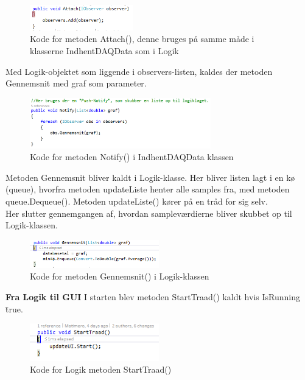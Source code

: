 \begin{figure}[H]
	\centering
	\includegraphics[width=0.4\textwidth]{FigurerProgram/AttachDaq}
	\caption{Kode for metoden Attach(), denne bruges på samme måde i klasserne IndhentDAQData som i Logik}
	\label{fig:AttachDAQ}
\end{figure}

Med Logik-objektet som liggende i observers-listen, kaldes der metoden Gennemsnit med graf som parameter.

\begin{figure}[H]
	\centering
	\includegraphics[width=0.7\textwidth]{FigurerProgram/NotifyDaq}
	\caption{Kode for metoden Notify() i IndhentDAQData klassen}
	\label{fig:NotifyDAQ}
\end{figure}

Metoden Gennemsnit bliver kaldt i Logik-klasse. Her bliver listen lagt i en kø (queue), hvorfra metoden updateListe henter alle samples fra, med metoden queue.Dequeue(). Metoden updateListe() kører på en tråd for sig selv.
\\Her slutter gennemgangen af, hvordan sampleværdierne bliver skubbet op til Logik-klassen.

\begin{figure}[H]
	\centering
	\includegraphics[width=0.5\textwidth]{FigurerProgram/GennemsnitLogik}
	\caption{Kode for metoden Gennemsnit() i Logik-klassen}
	\label{fig:GennemsnitLogik}
\end{figure}

\textbf{Fra Logik til GUI}
I starten blev metoden StartTraad() kaldt hvis IsRunning \= true.
\begin{figure}[H]
	\centering
	\includegraphics[width=0.5\textwidth]{FigurerProgram/StartTraad}
	\caption{Kode for Logik metoden StartTraad()}
	\label{fig:StartTraad}
\end{figure}

